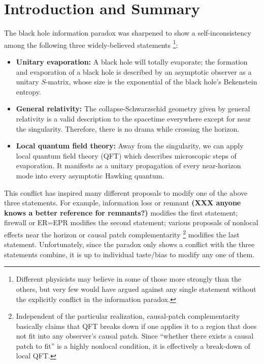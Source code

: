 \documentclass[aps,showpacs,twocolumn,floats,prd,superscriptaddress,nofootinbib]{revtex4-1}
\begin{document}
\maketitle


\onecolumngrid

\section{Introduction and Summary}

The black hole information paradox \cite{Haw76a} was sharpened to show a self-inconsistency among the following three widely-believed statements \cite{AMPS}
\footnote{Different physicists may believe in some of those more strongly than the others, but very few would have argued against any single statement without the explicitly conflict in the information paradox.}:
\begin{itemize}
\item {\bf Unitary evaporation:} A black hole will totally evaporate; the formation and evaporation of a black hole is described by an asymptotic observer as a unitary $S$-matrix, whose size is the exponential of the black hole's Bekenstein entropy.
\item {\bf General relativity:} The collapse-Schwarzschid geometry given by general relativity is a valid description to the spacetime everywhere except for near the singularity.
Therefore, there is no drama while crossing the horizon.
\item {\bf Local quantum field theory:} Away from the singularity, we can apply local quantum field theory (QFT) which describes microscopic steps of evaporation. 
It manifests as a unitary propagation of every near-horizon mode into every asymptotic Hawking quantum.
\end{itemize}

This conflict has inspired many different proposals to modify one of the above three statements. 
For example, information loss or remnant \cite{Bek94} {\bf (XXX anyone knows a better reference for remnants?)} modifies the first statement; 
firewall \cite{BraPir09,AMPS} or ER=EPR \cite{MalSus13} modifies the second statement;
various proposals of nonlocal effects near the horizon \cite{Gid12,DodSil15,OsuPag16} or causal patch complementarity \cite{HuiYan13,IlgYan13,LowTho14}
\footnote{Independent of the particular realization, causal-patch complementarity basically claims that QFT breaks down if one applies it to a region that does not fit into any observer's causal patch. 
Since ``whether there exists a causal patch to fit'' is a highly nonlocal condition, it is effectively a break-down of local QFT.} 
modifies the last statement.
Unfortunately, since the paradox only shows a conflict with the three statements combine, it is up to individual taste/bias to modify any one of them. 
\end{document}
